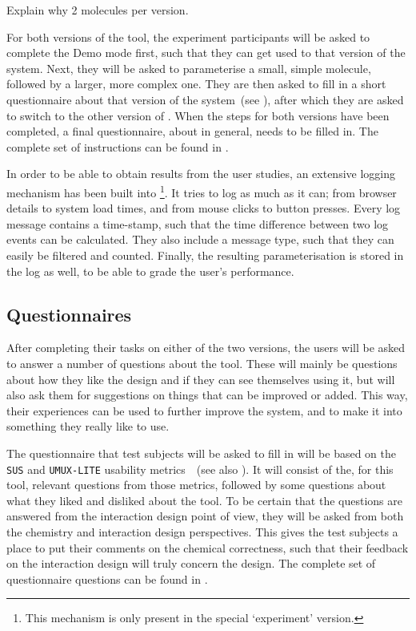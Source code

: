 \begin{todo}
\item Explain why 2 molecules per version.
\end{todo}

For both versions of the tool, the experiment participants will be asked to complete the Demo mode first, such that they can get used to that version of the system. Next, they will be asked to parameterise a small, simple molecule, followed by a larger, more complex one. They are then asked to fill in a short questionnaire about that version of the system~(see ), after which they are asked to switch to the other version of \oframp. When the steps for both versions have been completed, a final questionnaire, about \oframp{} in general, needs to be filled in. The complete set of instructions can be found in .

In order to be able to obtain results from the user studies, an extensive logging mechanism has been built into \oframp\footnote{This mechanism is only present in the special `experiment' version.}. It tries to log as much as it can; from browser details to system load times, and from mouse clicks to button presses. Every log message contains a time-stamp, such that the time difference between two log events can be calculated. They also include a message type, such that they can easily be filtered and counted. Finally, the resulting parameterisation is stored in the log as well, to be able to grade the user's performance.


\subsection{Questionnaires}
After completing their tasks on either of the two versions, the users will be asked to answer a number of questions about the tool. These will mainly be questions about how they like the design and if they can see themselves using it, but will also ask them for suggestions on things that can be improved or added. This way, their experiences can be used to further improve the system, and to make it into something they really like to use.

The questionnaire that test subjects will be asked to fill in will be based on the \verb|SUS| and \verb|UMUX-LITE| usability metrics~\cite{lewis2013umux}~(see also ). It will consist of the, for this tool, relevant questions from those metrics, followed by some questions about what they liked and disliked about the tool. To be certain that the questions are answered from the interaction design point of view, they will be asked from both the chemistry and interaction design perspectives. This gives the test subjects a place to put their comments on the chemical correctness, such that their feedback on the interaction design will truly concern the design. The complete set of questionnaire questions can be found in .

